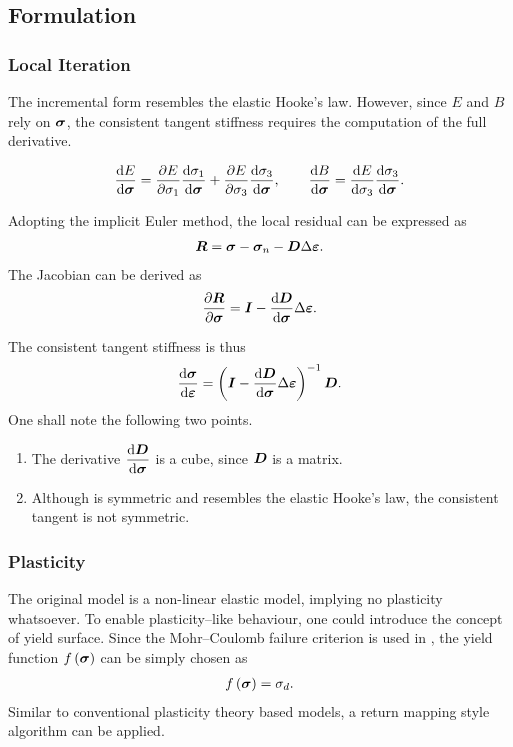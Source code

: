 \subsection{Formulation}
\subsubsection{Local Iteration}
The incremental form  resembles the elastic Hooke's law.
However, since $E$ and $B$ rely on $\bm{\sigma}$, the consistent tangent stiffness requires the computation of the full derivative.

\begin{gather}
\dfrac{\mathrm{d}E}{\mathrm{d}\bm{\sigma}}=\dfrac{\partial{E}}{\partial{\sigma_1}}\dfrac{\mathrm{d}\sigma_1}{\mathrm{d}\bm{\sigma}}+\dfrac{\partial{E}}{\partial{\sigma_3}}\dfrac{\mathrm{d}\sigma_3}{\mathrm{d}\bm{\sigma}},\qquad
\dfrac{\mathrm{d}B}{\mathrm{d}\bm{\sigma}}=\dfrac{\mathrm{d}E}{\mathrm{d}\sigma_3}\dfrac{\mathrm{d}\sigma_3}{\mathrm{d}\bm{\sigma}}.
\end{gather}

Adopting the implicit Euler method, the local residual can be expressed as
\begin{gather}
\bm{R}=\bm{\sigma}-\bm{\sigma}_n-\bm{D}\Delta\bm{\varepsilon}.
\end{gather}
The Jacobian can be derived as
\begin{gather}
\dfrac{\partial{\bm{R}}}{\partial{\bm{\sigma}}}=\bm{I}-\dfrac{\mathrm{d}\bm{D}}{\mathrm{d}\bm{\sigma}}\Delta\bm{\varepsilon}.
\end{gather}

The consistent tangent stiffness is thus
\begin{gather}
\dfrac{\mathrm{d}\bm{\sigma}}{\mathrm{d}\bm{\varepsilon}}=\left(\bm{I}-\dfrac{\mathrm{d}\bm{D}}{\mathrm{d}\bm{\sigma}}\Delta\bm{\varepsilon}\right)^{-1}\bm{D}.
\end{gather}
One shall note the following two points.
\begin{enumerate}
\item The derivative $\dfrac{\mathrm{d}\bm{D}}{\mathrm{d}\bm{\sigma}}$ is a cube, since $\bm{D}$ is a matrix.
\item Although  is symmetric and resembles the elastic Hooke's law, the consistent tangent is not symmetric.
\end{enumerate}
\subsubsection{Plasticity}
The original model is a non-linear elastic model, implying no plasticity whatsoever.
To enable plasticity--like behaviour, one could introduce the concept of yield surface. Since the Mohr--Coulomb failure criterion is used in , the yield function $f\left(\bm{\sigma}\right)$ can be simply chosen as
\begin{gather}
f\left(\bm{\sigma}\right)=\sigma_d.
\end{gather}
Similar to conventional plasticity theory based models, a return mapping style algorithm can be applied.

